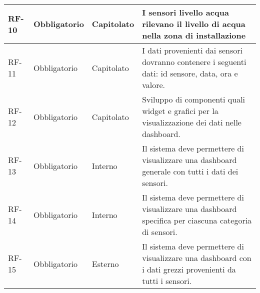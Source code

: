 \begin{longtable}{|>{\centering\arraybackslash}m{}|>{\centering\arraybackslash}m{}|>{\centering\arraybackslash}m{}|>{\centering\arraybackslash}m{}|}
	RF-10           & Obbligatorio        & Capitolato     & I sensori livello acqua rilevano il livello di acqua nella zona di installazione                                                                                                                                                                                                                                                                                                 \\\hline
	RF-11           & Obbligatorio        & Capitolato     & I dati provenienti dai sensori dovranno contenere i seguenti dati: id sensore, data, ora e valore.                                                                                                                                                                                                                                                                               \\\hline
	RF-12           & Obbligatorio        & Capitolato     & Sviluppo di componenti quali widget e grafici per la visualizzazione dei dati nelle dashboard.                                                                                                                                                                                                                                                                                   \\\hline
	RF-13           & Obbligatorio        & Interno        & Il sistema deve permettere di visualizzare una dashboard generale con tutti i dati dei sensori.                                                                                                                                                                                                                                                                                  \\\hline
	RF-14           & Obbligatorio        & Interno        & Il sistema deve permettere di visualizzare una dashboard specifica per ciascuna categoria di sensori.                                                                                                                                                                                                                                                                            \\\hline
	RF-15           & Obbligatorio        & Esterno        & Il sistema deve permettere di visualizzare una dashboard con i dati grezzi provenienti da tutti i sensori.                                                                                                                                                                                                                                                                       \\\hline

\end{longtable}
